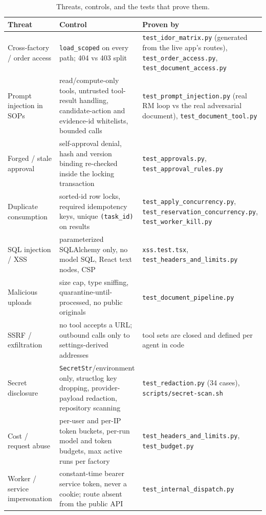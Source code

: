 \documentclass[11pt,a4paper]{article}
\begin{document}
\begin{table}[h]
\centering\small
\caption{Threats, controls, and the tests that prove them.}
\begin{tabularx}{\linewidth}{@{}L{3.0cm}YL{4.3cm}@{}}
\toprule
\textbf{Threat} & \textbf{Control} & \textbf{Proven by}\\
\midrule
Cross-factory / order access &
\texttt{load\_scoped} on every path; 404 vs 403 split &
\texttt{test\_idor\_matrix.py} (generated from the live app's routes), \texttt{test\_order\_access.py}, \texttt{test\_document\_access.py}\\
Prompt injection in SOPs &
read/compute-only tools, untrusted tool-result handling, candidate-action and
evidence-id whitelists, bounded calls &
\texttt{test\_prompt\_injection.py} (real RM loop vs the real adversarial document), \texttt{test\_document\_tool.py}\\
Forged / stale approval &
self-approval denial, hash and version binding re-checked inside the locking
transaction &
\texttt{test\_approvals.py}, \texttt{test\_approval\_rules.py}\\
Duplicate consumption &
sorted-id row locks, required idempotency keys, unique \texttt{(task\_id)} on results &
\texttt{test\_apply\_concurrency.py}, \texttt{test\_reservation\_concurrency.py}, \texttt{test\_worker\_kill.py}\\
SQL injection / XSS &
parameterized SQLAlchemy only, no model SQL, React text nodes, CSP &
\texttt{xss.test.tsx}, \texttt{test\_headers\_and\_limits.py}\\
Malicious uploads &
size cap, type sniffing, quarantine-until-processed, no public originals &
\texttt{test\_document\_pipeline.py}\\
SSRF / exfiltration &
no tool accepts a URL; outbound calls only to settings-derived addresses &
tool sets are closed and defined per agent in code\\
Secret disclosure &
\texttt{SecretStr}/environment only, structlog key dropping, provider-payload redaction, repository scanning &
\texttt{test\_redaction.py} (34 cases), \texttt{scripts/secret-scan.sh}\\
Cost / request abuse &
per-user and per-IP token buckets, per-run model and token budgets, max active runs per factory &
\texttt{test\_headers\_and\_limits.py}, \texttt{test\_budget.py}\\
Worker / service impersonation &
constant-time bearer service token, never a cookie; route absent from the public API &
\texttt{test\_internal\_dispatch.py}\\
\bottomrule
\end{tabularx}
\end{table}
\end{document}
